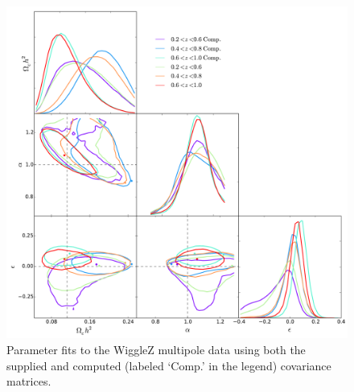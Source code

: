 \documentclass[titlesmallcaps, examinerscopy, copyrightpage]{uqthesis}
\begin{document}
\begin{appendices}
\begin{figure}[h!]
  \begin{center}
    \includegraphics[width=1\textwidth]{images/computedDiff.pdf}
  \end{center}
  \caption{Parameter fits to the WiggleZ multipole data using both the supplied and computed (labeled `Comp.' in the legend) covariance matrices.}
  \label{fig:DcomputedDiff}
\end{figure}



\end{appendices}


\end{document}
